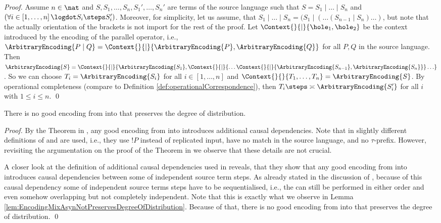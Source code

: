 \documentclass[]{llncs}
\begin{document}
\begin{proof}
	Assume $ n \in \nat $ and $ S, S_1, \ldots, S_n, S_1', \ldots, S_n' $ are terms of the source language such that $ S = S_1 \mid \ldots \mid S_n $ and $ \left( \forall i \in \left[ 1, \ldots, n \right] \logdot S_i \steps S_i' \right) $. Moreover, for simplicity, let us assume, that $ S_1 \mid \ldots \mid S_n = ( S_1 \mid ( \ldots ( S_{n - 1} \mid S_n ) \ldots ) $, but note that the actually orientation of the brackets is not import for the rest of the proof. Let $ \Context{}{\mid}{\hole_1, \hole_2} $ be the context introduced by the encoding of the parallel operator, i.e., $ \ArbitraryEncoding{P \mid Q } = \Context{}{\mid}{\ArbitraryEncoding{P}, \ArbitraryEncoding{Q}} $ for all $ P, Q $ in the source language. Then $ \ArbitraryEncoding{S} = \Context{}{\mid}{\ArbitraryEncoding{S_1}, \Context{}{\mid}{\ldots \Context{}{\mid}{\ArbitraryEncoding{S_{n - 1}}, \ArbitraryEncoding{S_n}}} \ldots } $. So we can choose $ T_i = \ArbitraryEncoding{S_i} $ for all $ i \in \left[ 1, \ldots, n \right] $ and $ \Context{}{}{T_1, \ldots, T_n} = \ArbitraryEncoding{S} $. By operational completeness (compare to Definition \ref{def:operationalCorrespondence}), then $ T_i \steps \asymp \ArbitraryEncoding{S_i'} $ for all $ i $ with $ 1 \leq i \leq n $.
	\qed
\end{proof}

\begin{theorem}
	There is no good encoding from \piMix into \piAsyn that preserves the degree of distribution.
\end{theorem}

\begin{proof}
	By the Theorem in \cite{petersSchickeNestmann11}, any good encoding from \piMix into \piAsyn introduces additional causal dependencies. Note that in \cite{petersSchickeNestmann11} slightly different definitions of \piMix and \piAsyn are used, i.e., they use $ !P $ instead of replicated input, have no match in the source language, and no $ \tau $-prefix. However, revisiting the argumentation on the proof of the Theorem in \cite{petersSchickeNestmann11} we observe that these details are not crucial.
	
	A closer look at the definition of additional causal dependencies used in \cite{petersSchickeNestmann11} reveals, that they show that any good encoding from \piMix into \piAsyn introduces causal dependencies between some \simulations of independent source term steps. As already stated in the discussion of \cite{petersSchickeNestmann11}, because of this causal dependency some \simulations of independent source terms steps have to be sequentialised, i.e., the \simulations can still be performed in either order and even somehow overlapping but not completely independent. Note that this is exactly what we observe in Lemma \ref{lem:EncodingMixAsynNotPreservesDegreeOfDistribution}. Because of that, there is no good encoding from \piMix into \piAsyn that preserves the degree of distribution.
	\qed
\end{proof}
\end{document}
